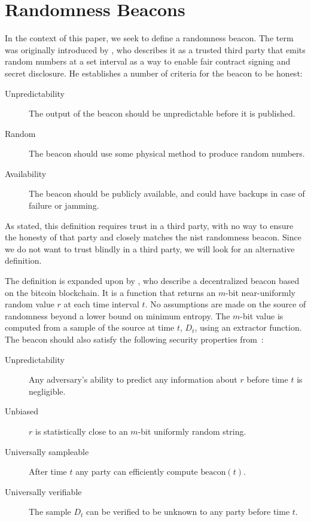 \section{Randomness Beacons}

In the context of this paper, we seek to define a randomness beacon.
The term was originally introduced by \citet{rabin1983transaction}, who describes it as a trusted third party that emits random numbers at a set interval as a way to enable fair contract signing and secret disclosure.
He establishes a number of criteria for the beacon to be honest:

\begin{description}
    \item[Unpredictability] The output of the beacon should be unpredictable before it is published.
    \item[Random] The beacon should use some physical method to produce random numbers.
    \item[Availability] The beacon should be publicly available, and could have backups in case of failure or jamming.
\end{description}

As stated, this definition requires trust in a third party, with no way to ensure the honesty of that party and closely matches the \gls{nist} randomness beacon.
Since we do not want to trust blindly in a third party, we will look for an alternative definition.

The definition is expanded upon by \citet{bonneau2015bitcoin}, who describe a decentralized beacon based on the bitcoin blockchain.
It is a function that returns an $m$-bit near-uniformly random value $r$ at each time interval $t$.
No assumptions are made on the source of randomness beyond a lower bound on minimum entropy.
The $m$-bit value is computed from a sample of the source at time $t$, $D_t$, using an extractor function.
The beacon should also satisfy the following security properties from~\cite{bonneau2015bitcoin}:

\begin{description}
    \item[Unpredictability] Any adversary's ability to predict any information about $r$ before time $t$ is negligible.
    \item[Unbiased] $r$ is statistically close to an $m$-bit uniformly random string.
    \item[Universally sampleable] After time $t$ any party can efficiently compute $\text{beacon}(t)$.
    \item[Universally verifiable] The sample $D_t$ can be verified to be unknown to any party before time $t$.
\end{description}

